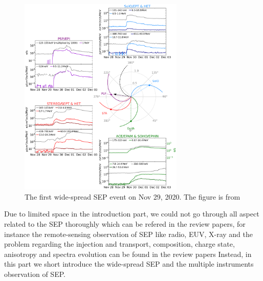 \begin{figure}
	\centering
	\includegraphics[width = 0.7\textwidth]{images/2020-11-29_overview_plot.png}
	\caption{The first wide-spread \acl{SEP} event on Nov 29, 2020. The figure is from \citep{Kollhoff-2021}}
	\label{Fig:SEP_widespread}
\end{figure}

Due to limited space in the introduction part, we could not go through all aspect 
related to the \ac{SEP} thoroughly which can be refered in the review papers, for instance the remote-sensing observation of SEP like radio, EUV, X-ray and the problem regarding the injection and transport, composition, charge state, anisotropy and spectra evolution can be found in the review papers \citet{reames2013two, Desai_Diacalone2016LRSP, Reames2021LNP}
Instead, in this part we short introduce the wide-spread SEP and the multiple instruments observation of SEP.

